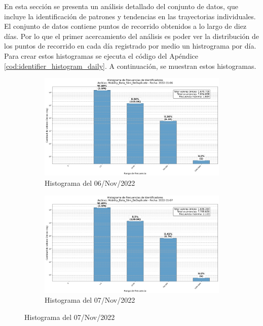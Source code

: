 En esta sección se presenta un análisis detallado del conjunto de datos, que incluye la identificación de patrones y tendencias en las trayectorias individuales. El conjunto de datos contiene puntos de recorrido obtenidos a lo largo de diez días. Por lo que el primer acercamiento del análisis es poder ver la distribución de los puntos de recorrido en cada día registrado por medio un histrograma por día. Para crear estos histogramas se ejecuta el código del Apéndice \ref{cod:identifier_histogram_daily}. A continuación, se muestran estos histogramas.

\begin{figure}[htbp]
    \centering
    \begin{subfigure}[t]{0.48\textwidth-1em}
        \includegraphics[width=\linewidth]{img/daily_histograms/histograma_identifier_Mobility_Data_Slim_DeDuplicate_2022-11-06.png}
        \caption{Histograma del 06/Nov/2022}
        \label{fig:sub1}
    \end{subfigure}
    \hfill
    \begin{subfigure}[t]{0.48\textwidth-1em}
        \includegraphics[width=\linewidth]{img/daily_histograms/histograma_identifier_Mobility_Data_Slim_DeDuplicate_2022-11-07.png}
        \caption{Histograma del 07/Nov/2022}
        \label{fig:sub2}
    \end{subfigure}


\end{figure}
